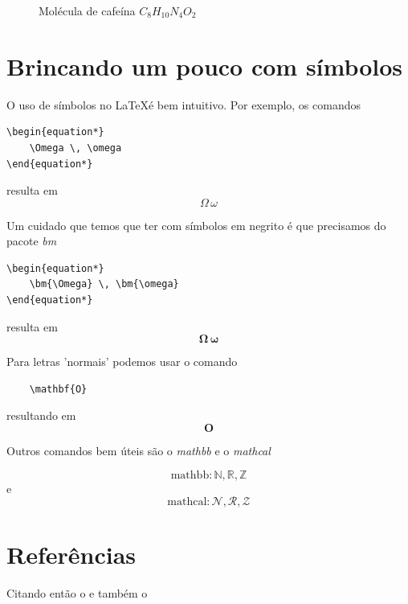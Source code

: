\documentclass{article}
\begin{document}
\begin{figure}[h!]
    \centering
{}    
    \caption{Molécula de cafeína $C_8H_{10}N_4O_2$}
    \label{fig:cafeina}
\end{figure}

\section{Brincando um pouco com símbolos}

O uso de símbolos no \LaTeX é bem intuitivo. Por exemplo, os comandos
\begin{lstlisting}
\begin{equation*}
    \Omega \, \omega
\end{equation*}
\end{lstlisting}
resulta em 
\begin{equation*}
    \Omega \, \omega
\end{equation*}

Um cuidado que temos que ter com símbolos em negrito é que precisamos do pacote \textit{bm}

\begin{lstlisting}
\begin{equation*}
    \bm{\Omega} \, \bm{\omega}
\end{equation*}
\end{lstlisting}
resulta em 
\begin{equation*}
    \bm{\Omega} \, \bm{\omega}
\end{equation*}

Para letras 'normais' podemos usar o comando
\begin{lstlisting}
    \mathbf{O}
\end{lstlisting}
resultando em 
\begin{equation*}
    \mathbf{O}
\end{equation*}

Outros comandos bem úteis são  o \textit{mathbb} e o \textit{mathcal}

\begin{equation*}
  \text{mathbb}:  \mathbb{N}, \mathbb{R}, \mathbb{Z}
\end{equation*}
e
\begin{equation*}
  \text{mathcal}:  \mathcal{N}, \mathcal{R}, \mathcal{Z}
\end{equation*}

\section{Referências}

Citando então o \cite{nomefacil1} e também o \cite{nomefacil2}

\printbibliography
\end{document}
